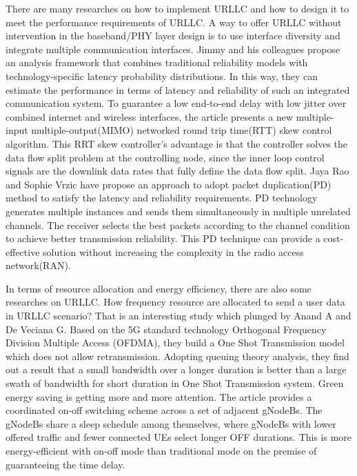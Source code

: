 \documentclass[conference]{IEEEtran}
\begin{document}
There are many researches on how to implement URLLC and how to design it to meet the performance requirements of URLLC.
A way to offer URLLC without intervention in the baseband/PHY layer design is to use interface diversity and integrate multiple
communication interfaces. Jimmy and his colleagues propose an analysis framework that combines traditional reliability models with technology-specific latency probability distributions\cite{interface}. In this way, they can estimate the performance in terms of latency and reliability of such an integrated communication system.
To guarantee a low end-to-end delay with low jitter over combined internet and wireless interfaces, the article \cite{multiconnectivity} presents a new multiple-input multiple-output(MIMO) networked round trip time(RTT) skew control algorithm. This RRT skew controller's advantage is that the controller solves the data flow split problem at the controlling node, since the inner loop control signals are the downlink data rates that fully define the data flow split.
Jaya Rao and Sophie Vrzic have propose an approach to adopt packet duplication(PD) method to satisfy the latency and reliability requirements\cite{PD}. PD technology generates multiple instances and sends them simultaneously in multiple unrelated channels. The receiver selects the best packets according to the channel condition to achieve better transmission reliability. This PD technique can provide a cost-effective solution without increasing the complexity in the radio access network(RAN).

In terms of resource allocation and energy efficiency, there are also some researches on URLLC.
How frequency resource are allocated to send a user data in URLLC scenario? That is an interesting study which plunged by Anand A and De Veciana G\cite{Anand}. Based on the 5G standard technology Orthogonal Frequency Division Multiple Access (OFDMA), they build a One Shot Transmission model which does not allow retransmission.  Adopting queuing theory analysis, they find out a result that a small bandwidth over a longer duration is better than a large swath of bandwidth for short duration in One Shot Transmission system.
Green energy saving is getting more and more attention. The article \cite{Energy} provides a coordinated on-off switching scheme across a set of adjacent gNodeBs. The gNodeBs share a sleep schedule among themselves, where gNodeBs with lower offered traffic and fewer connected UEs select longer OFF durations. This is more energy-efficient with on-off mode than traditional mode on the premise of guaranteeing the time delay.
\end{document}
